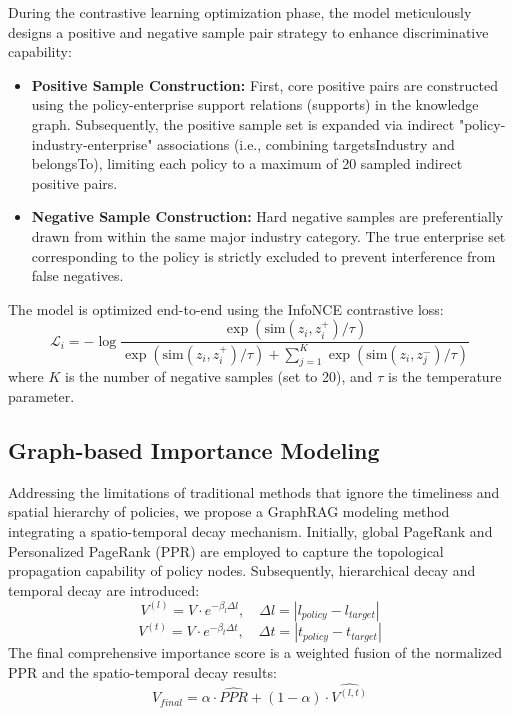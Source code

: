 During the contrastive learning optimization phase, the model meticulously designs a positive and negative sample pair strategy to enhance discriminative capability:
\begin{itemize}
    \item \textbf{Positive Sample Construction:} First, core positive pairs are constructed using the policy-enterprise support relations (supports) in the knowledge graph. Subsequently, the positive sample set is expanded via indirect "policy-industry-enterprise" associations (i.e., combining targetsIndustry and belongsTo), limiting each policy to a maximum of 20 sampled indirect positive pairs.
    \item \textbf{Negative Sample Construction:} Hard negative samples are preferentially drawn from within the same major industry category. The true enterprise set corresponding to the policy is strictly excluded to prevent interference from false negatives.
\end{itemize}

The model is optimized end-to-end using the InfoNCE contrastive loss:
$$ \mathcal{L}_{i} = -\log\frac{\exp(\mathrm{sim}(z_i,z_i^+)/\tau)}{\exp(\mathrm{sim}(z_i,z_i^+)/\tau)+\sum_{j=1}^{K}\exp(\mathrm{sim}(z_i,z_j^-)/\tau)} $$
where $K$ is the number of negative samples (set to 20), and $\tau$ is the temperature parameter.

\subsection{Graph-based Importance Modeling}
Addressing the limitations of traditional methods that ignore the timeliness and spatial hierarchy of policies, we propose a GraphRAG modeling method integrating a spatio-temporal decay mechanism. Initially, global PageRank and Personalized PageRank (PPR) are employed to capture the topological propagation capability of policy nodes. Subsequently, hierarchical decay and temporal decay are introduced:
$$ V^{(l)} = V \cdot e^{-\beta_l\Delta l}, \quad \Delta l = |l_{policy}-l_{target}| $$
$$ V^{(t)} = V \cdot e^{-\beta_t\Delta t}, \quad \Delta t = |t_{policy}-t_{target}| $$
The final comprehensive importance score is a weighted fusion of the normalized PPR and the spatio-temporal decay results:
$$ V_{final} = \alpha \cdot \widehat{PPR} + (1-\alpha)\cdot \widehat{V^{(l,t)}} $$

